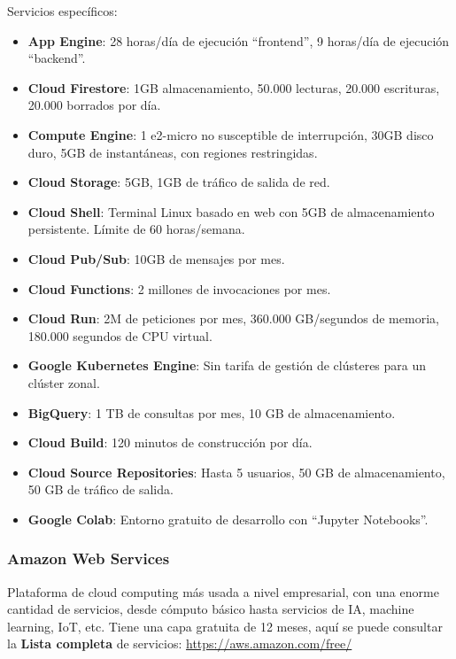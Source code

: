 Servicios específicos:
\begin{itemize}
	\item \textbf{App Engine}: 28 horas/día de ejecución ``frontend'', 9 horas/día de ejecución ``backend''.
	\item \textbf{Cloud Firestore}: 1GB almacenamiento, 50.000 lecturas, 20.000 escrituras, 20.000 borrados por día.
	\item \textbf{Compute Engine}: 1 e2-micro no susceptible de interrupción, 30GB disco duro, 5GB de instantáneas, con regiones restringidas.
	\item \textbf{Cloud Storage}: 5GB, 1GB de tráfico de salida de red.
	\item \textbf{Cloud Shell}: Terminal Linux basado en web con 5GB de almacenamiento persistente. Límite de 60 horas/semana.
	\item \textbf{Cloud Pub/Sub}: 10GB de mensajes por mes.
	\item \textbf{Cloud Functions}: 2 millones de invocaciones por mes.
	\item \textbf{Cloud Run}: 2M de peticiones por mes, 360.000 GB/segundos de memoria, 180.000 segundos de CPU virtual.
	\item \textbf{Google Kubernetes Engine}: Sin tarifa de gestión de clústeres para un clúster zonal.
	\item \textbf{BigQuery}: 1 TB de consultas por mes, 10 GB de almacenamiento.
	\item \textbf{Cloud Build}: 120 minutos de construcción por día.
	\item \textbf{Cloud Source Repositories}: Hasta 5 usuarios, 50 GB de almacenamiento, 50 GB de tráfico de salida.
	\item \textbf{Google Colab}: Entorno gratuito de desarrollo con ``Jupyter Notebooks''.
\end{itemize}

\subsubsection*{Amazon Web Services}

Plataforma de cloud computing más usada a nivel empresarial, con una enorme cantidad de servicios, desde cómputo básico hasta servicios de IA, machine learning, IoT, etc. Tiene una capa gratuita de 12 meses, aquí se puede consultar la \textbf{Lista completa} de servicios: \url{https://aws.amazon.com/free/}

